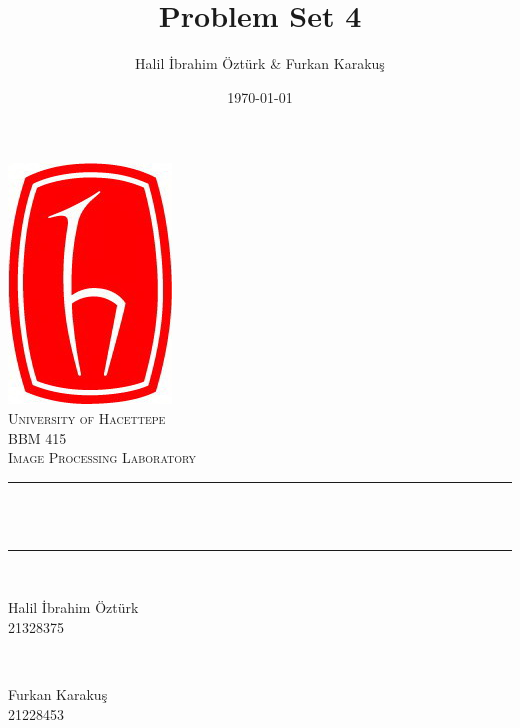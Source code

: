 \documentclass[12pt]{article}
\title{Problem Set 4}                             %
\author{Halil \.{I}brahim \"{O}zt\"{u}rk \& Furkan Karakuş}               %
\date{\today}                                           %
\makeatletter
\let\thetitle\@title
\let\thedate\@date
\makeatother
\begin{document}

\begin{titlepage}
    \centering
    \vspace*{0.5 cm}
    \includegraphics[scale = 0.5]{hacettepe.jpg}\\[1.0 cm]   %
    \textsc{\LARGE University of Hacettepe}\\[2.0 cm]   %
    \textsc{\Large BBM 415}\\[0.5 cm]               %
    \textsc{\large Image Processing Laboratory}\\[0.5 cm]               %
    \rule{\linewidth}{0.2 mm} \\[0.4 cm]
    { \huge \bfseries \thetitle}\\
    \rule{\linewidth}{0.2 mm} \\[1.5 cm]
    
    \begin{minipage}{0.4\textwidth}
        \begin{flushleft} \large
	   Halil \.{I}brahim \"{O}zt\"{u}rk \\
            21328375                                   %

         \end{flushleft}
            \end{minipage}~
            \begin{minipage}{0.4\textwidth}
         \begin{flushright} \large
            Furkan Karakuş \\
            21228453                                   %

        \end{flushright}
    \end{minipage}\\[2 cm]
    
    {\large \thedate}\\[2 cm]
 
    \vfill
    
\end{titlepage}
\end{document}
